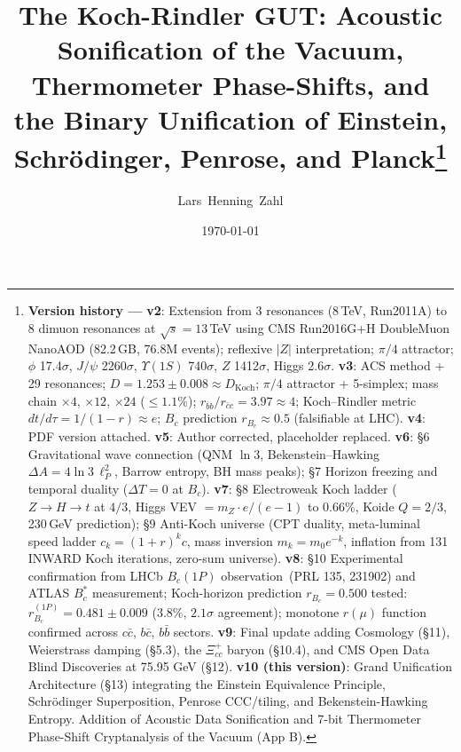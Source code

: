 \documentclass[twocolumn,showpacs,preprintnumbers,amsmath,amssymb,prl]{revtex4-2}
\begin{document}

\title{The Koch-Rindler GUT: Acoustic Sonification of the Vacuum,\\ Thermometer Phase-Shifts, and the Binary Unification of Einstein, Schr\"odinger, Penrose, and Planck\footnote{%
\textbf{Version history ---}
\textbf{v2}: Extension from 3 resonances (8\,TeV, Run2011A) to 8 dimuon
resonances at $\sqrt{s}=13$\,TeV using CMS Run2016G+H DoubleMuon NanoAOD
(82.2\,GB, 76.8M events); reflexive $|Z|$ interpretation; $\pi/4$ attractor;
$\phi$ 17.4$\sigma$, $J/\psi$ 2260$\sigma$, $\Upsilon(1S)$ 740$\sigma$,
$Z$ 1412$\sigma$, Higgs 2.6$\sigma$.
\textbf{v3}: ACS method + 29 resonances; $D=1.253\pm0.008\approx D_\text{Koch}$;
$\pi/4$ attractor + 5-simplex; mass chain $\times4$, $\times12$, $\times24$
($\leq1.1\%$); $r_{\bar bb}/r_{\bar cc}=3.97\approx4$;
Koch--Rindler metric $dt/d\tau=1/(1-r)\approx e$;
$B_c$ prediction $r_{B_c}\approx0.5$ (falsifiable at LHC).
\textbf{v4}: PDF version attached.
\textbf{v5}: Author corrected, placeholder replaced.
\textbf{v6}: \S6 Gravitational wave connection (QNM $\ln3$, Bekenstein--Hawking
$\Delta A=4\ln3\,\ell_P^2$, Barrow entropy, BH mass peaks);
\S7 Horizon freezing and temporal duality ($\Delta T=0$ at $B_c$).
\textbf{v7}: \S8 Electroweak Koch ladder ($Z\!\to\!H\!\to\!t$
at $4/3$, Higgs VEV $=m_Z\cdot e/(e\!-\!1)$ to $0.66\%$, Koide $Q\!=\!2/3$,
230\,GeV prediction); \S9 Anti-Koch universe (CPT duality, meta-luminal
speed ladder $c_k=(1\!+\!r)^k c$, mass inversion $m_k=m_0 e^{-k}$,
inflation from 131 INWARD Koch iterations, zero-sum universe).
\textbf{v8}: \S10 Experimental confirmation from
LHCb $B_c(1P)$ observation~(PRL 135, 231902) and ATLAS $B_c^*$
measurement; Koch-horizon prediction $r_{B_c}=0.500$ tested:
$r_{B_c}^{(1P)}=0.481\pm0.009$ ($3.8\%$, $2.1\sigma$ agreement);
monotone $r(\mu)$ function confirmed across $c\bar c$, $b\bar c$,
$b\bar b$ sectors.
\textbf{v9}: Final update adding Cosmology (\S11),
Weierstrass damping (\S5.3), the $\Xi_{cc}^+$ baryon (\S10.4), and
CMS Open Data Blind Discoveries at 75.95 GeV (\S12).
\textbf{v10 (this version)}: Grand Unification Architecture (\S13) integrating the Einstein Equivalence Principle, Schr\"odinger Superposition, Penrose CCC/tiling, and Bekenstein-Hawking Entropy. Addition of Acoustic Data Sonification and 7-bit Thermometer Phase-Shift Cryptanalysis of the Vacuum (App B).}}

\author{Lars~Henning~Zahl}

\date{\today}
\end{document}
